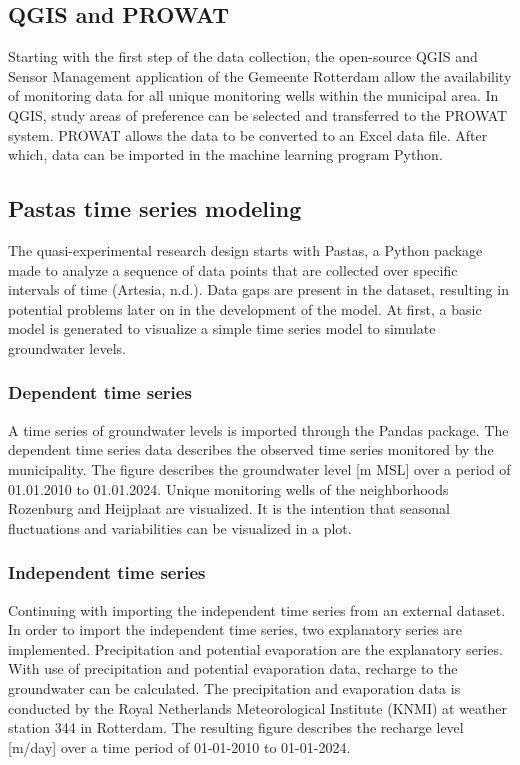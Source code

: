 \subsection{QGIS and PROWAT}
Starting with the first step of the data collection, the open-source QGIS and Sensor Management application of the Gemeente Rotterdam allow the availability of monitoring data for all unique monitoring wells within the municipal area. In QGIS, study areas of preference can be selected and transferred to the PROWAT system. PROWAT allows the data to be converted to an Excel data file. After which, data can be imported in the machine learning program Python.

\subsection{Pastas time series modeling}
The quasi-experimental research design starts with Pastas, a Python package made to analyze a sequence of data points that are collected over specific intervals of time (Artesia, n.d.). Data gaps are present in the dataset, resulting in potential problems later on in the development of the model. At first, a basic model is generated to visualize a simple time series model to simulate groundwater levels.

\subsubsection{Dependent time series}
A time series of groundwater levels is imported through the Pandas package. The dependent time series data describes the observed time series monitored by the municipality. The figure describes the groundwater level [m MSL] over a period of 01.01.2010 to 01.01.2024. Unique monitoring wells of the neighborhoods Rozenburg and Heijplaat are visualized. It is the intention that seasonal fluctuations and variabilities can be visualized in a plot. 

\subsubsection{Independent time series}
Continuing with importing the independent time series from an external dataset. In order to import the independent time series, two explanatory series are implemented. Precipitation and potential evaporation are the explanatory series. With use of precipitation and potential evaporation data, recharge to the groundwater can be calculated. The precipitation and evaporation data is conducted by the Royal Netherlands Meteorological Institute (KNMI) at weather station 344 in Rotterdam. The resulting figure describes the recharge level [m/day] over a time period of 01-01-2010 to 01-01-2024.

